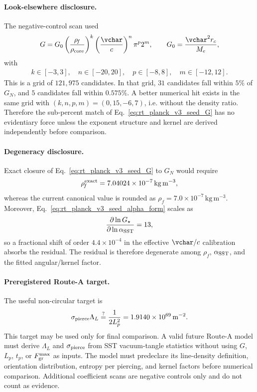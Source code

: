 \paragraph{Look-elsewhere disclosure.}
The negative-control scan used
\begin{align}
    G
    =
    G_0
    \left(\frac{\rho_{\!f}}{\rho_{\rm core}}\right)^k
    \left(\frac{\vchar}{c}\right)^n
    \pi^p2^m,
    \qquad
    G_0=\frac{\vchar^2r_c}{M_e},
\end{align}
with
\begin{align}
    k\in[-3,3],\quad
    n\in[-20,20],\quad
    p\in[-8,8],\quad
    m\in[-12,12].
\end{align}
This is a grid of \(121{,}975\) candidates.  In that grid, \(31\) candidates
fall within \(5\%\) of \(G_N\), and \(5\) candidates fall within \(0.575\%\).
A better numerical hit exists in the same grid with
\((k,n,p,m)=(0,15,-6,7)\), i.e. without the density ratio.  Therefore the
sub-percent match of Eq.~\eqref{eq:rt_planck_v3_seed_G} has no evidentiary
force unless the exponent structure and kernel are derived independently before
comparison.

\paragraph{Degeneracy disclosure.}
Exact closure of Eq.~\eqref{eq:rt_planck_v3_seed_G} to \(G_N\) would require
\begin{align}
    \rho_{\!f}^{\rm exact}
    =7.04024\times10^{-7}\,\mathrm{kg\,m^{-3}},
\end{align}
whereas the current canonical value is rounded as
\(\rho_{\!f}=7.0\times10^{-7}\,\mathrm{kg\,m^{-3}}\).  Moreover,
Eq.~\eqref{eq:rt_planck_v3_seed_alpha_form} scales as
\begin{align}
    \frac{\partial\ln G_{\star}}{\partial\ln\alpha_{\rm SST}}=13,
\end{align}
so a fractional shift of order \(4.4\times10^{-4}\) in the effective
\(\vchar/c\) calibration absorbs the residual.  The residual is therefore
degenerate among \(\rho_{\!f}\), \(\alpha_{\rm SST}\), and the fitted
angular/kernel factor.

\paragraph{Preregistered Route-A target.}
The useful non-circular target is
\begin{align}
    \sigma_{\rm pierce}\Lambda_L
    \stackrel{?}{=}
    \frac{1}{2L_p^2}
    =1.9140\times10^{69}\,\mathrm{m^{-2}}.
    \label{eq:rt_planck_v3_route_A_target}
\end{align}
This target may be used only for final comparison.  A valid future Route-A
model must derive \(\Lambda_L\) and \(\sigma_{\rm pierce}\) from SST
vacuum-tangle statistics without using \(G\), \(L_p\), \(t_p\), or
\(F_{\rm gr}^{\max}\) as inputs.  The model must predeclare its line-density
definition, orientation distribution, entropy per piercing, and kernel factors
before numerical comparison.  Additional coefficient scans are negative controls
only and do not count as evidence.
